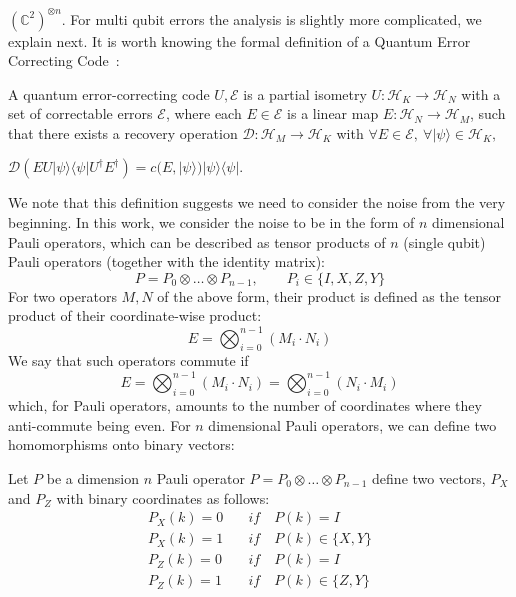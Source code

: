 \({(\mathbb{C}^2)}^{\otimes n}\). For multi qubit errors the analysis is slightly more complicated, we explain next. 
It is worth knowing the formal definition of a Quantum Error Correcting Code~\cite{gottesman2026surviving}:
\begin{definition}
A quantum error-correcting code \(U,\mathcal{E}\) is a partial isometry
\(U:\mathcal{H}_{K}\to\mathcal{H}_{N}\)
with a set of correctable errors \(\mathcal{E}\), where each
\(E\in\mathcal{E}\) is a linear map \(E:\mathcal{H}_{N}\to\mathcal{H}_{M}\), such that there exists a recovery operation
\(\mathcal{D}:\mathcal{H}_{M}\to\mathcal{H}_{K}\) with
\(\forall E\in\mathcal{E},\ \forall|\psi\rangle\in\mathcal{H}_{K},\)
\begin{center}
\(\mathcal{D}(E U|\psi\rangle\langle\psi| U^{\dagger} E^{\dagger}) = c(E,|\psi\rangle)|\psi\rangle\langle\psi|.\)
\end{center}
\end{definition}
\noindent We note that this definition suggests we need to consider the noise from the very beginning. In this work, we consider the noise to be in the form of \(n\) dimensional Pauli operators, which can be described as tensor products of \(n\) (single qubit) Pauli operators (together with the identity matrix):
\begin{equation}
    P = P_0 \otimes\ldots\otimes P_{n-1} , \qquad P_i\in\{I,X,Z,Y\}
\end{equation}
For two operators \(M, N\) of the above form, their product is defined as the tensor product of their coordinate-wise product:
\begin{equation}
    E = \bigotimes_{i=0}^{n-1}{(M_i \cdot N_i)}
\end{equation}
We say that such operators commute if 
\begin{equation}
    E = \bigotimes_{i=0}^{n-1}{(M_i \cdot N_i)} = \bigotimes_{i=0}^{n-1}{(N_i \cdot M_i)}
\end{equation}
which, for Pauli operators, amounts to the number of coordinates where they anti-commute being even. For \(n\) dimensional Pauli operators, we can define two homomorphisms onto binary vectors:
\begin{definition}\label{eq:projection}
Let \(P\) be a dimension \(n\) Pauli operator \(P = P_0 \otimes \ldots \otimes P_{n-1} \) define two vectors, \(P_X\) and \(P_Z\)  with binary coordinates as follows:
\begin{equation}
\begin{split}
 P_X(k) = 0  \quad &if \quad P(k)= I\\
P_X(k) = 1   \quad &if \quad P(k)\in \{X,Y\} \\
 P_Z(k) = 0  \quad &if \quad P(k)= I\\
P_Z(k) = 1   \quad &if \quad P(k)\in \{Z,Y\} \\
\end{split}
\end{equation}
\end{definition}
